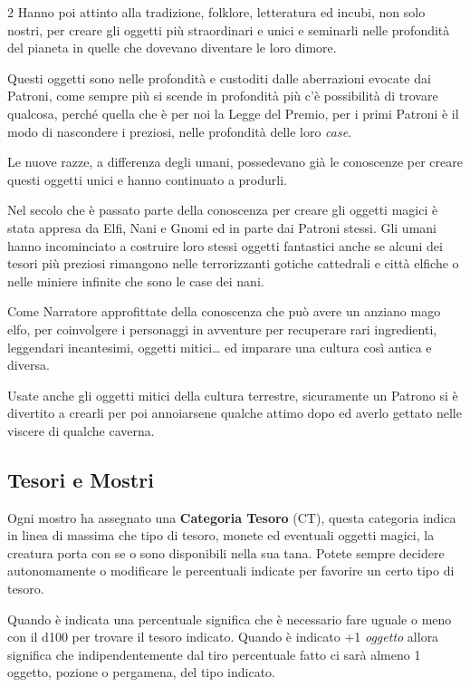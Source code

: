 \begin{multicols}{2}
Hanno poi attinto alla tradizione, folklore, letteratura ed incubi, non solo nostri, per creare gli oggetti più straordinari e unici e seminarli nelle profondità del pianeta in quelle che dovevano diventare le loro dimore.

Questi oggetti sono nelle profondità e custoditi dalle aberrazioni evocate dai Patroni, come sempre più si scende in profondità più c'è possibilità di trovare qualcosa, perché quella che è per noi la Legge del Premio, per i primi Patroni è il modo di nascondere i preziosi, nelle profondità delle loro \emph{case}.

Le nuove razze, a differenza degli umani, possedevano già le conoscenze per creare questi oggetti unici e hanno continuato a produrli.

Nel secolo che è passato parte della conoscenza per creare gli oggetti magici è stata appresa da Elfi, Nani e Gnomi ed in parte dai Patroni stessi. Gli umani hanno incominciato a costruire loro stessi oggetti fantastici anche se alcuni dei tesori più preziosi rimangono nelle terrorizzanti gotiche cattedrali e città elfiche o nelle miniere infinite che sono le case dei nani.

Come Narratore approfittate della conoscenza che può avere un anziano mago elfo, per coinvolgere i personaggi in avventure per recuperare rari ingredienti, leggendari incantesimi, oggetti mitici… ed imparare una cultura così antica e diversa.

Usate anche gli oggetti mitici della cultura terrestre, sicuramente un Patrono si è divertito a crearli per poi annoiarsene qualche attimo dopo ed averlo gettato nelle viscere di qualche caverna.

\subsection{Tesori e Mostri}

Ogni mostro ha assegnato una \textbf{Categoria Tesoro} (CT), questa categoria indica in linea di massima che tipo di tesoro, monete ed eventuali oggetti magici, la creatura porta con se o sono disponibili nella sua tana. Potete sempre decidere autonomamente o modificare le percentuali indicate per favorire un certo tipo di tesoro.

Quando è indicata una percentuale significa che è necessario fare uguale o meno con il d100 per trovare il tesoro indicato. Quando è indicato +1 \emph{oggetto} allora significa che indipendentemente dal tiro percentuale fatto ci sarà almeno 1 oggetto, pozione o pergamena, del tipo indicato.


\end{multicols}
